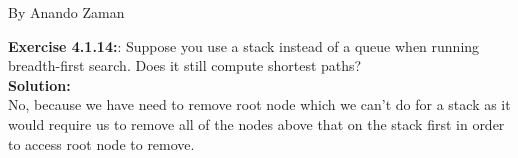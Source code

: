 \documentclass[11pt,fleqn]{article}
\begin{document}
By Anando Zaman

\textbf{Exercise 4.1.14:}: Suppose you use a stack instead of a queue
when running breadth-first search. Does it still
compute shortest paths?\\

\textbf{Solution:}\\
No, because we have need to remove root node which we can't do for a stack as it would require us to remove all of the nodes above that on the stack first in order to access root node to remove.


	
\end{document}
